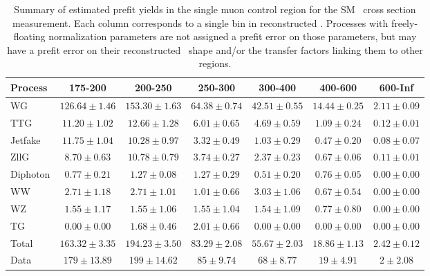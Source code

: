 \begin{table}[htbp]
  \begin{center}
    \caption{Summary of estimated prefit yields in the single muon control region for the SM \zinvg\ cross section measurement.
    Each column corresponds to a single bin in reconstructed \ETgamma. Processes with freely-floating normalization parameters
    are not assigned a prefit error on those parameters, but may have a prefit error on their reconstructed \ETgamma\ shape
    and/or the transfer factors linking them to other regions.}
    \label{tab:BkgSummaryMonomu_prefit}
    \begin{tabular}{|l|c|c|c|c|c|c|}
      \hline
      Process & 175-200 & 200-250 & 250-300 & 300-400 & 400-600 & 600-Inf \\
      \hline
      WG & $126.64{\pm}1.46$ & $153.30{\pm}1.63$ & $64.38{\pm}0.74$ & $42.51{\pm}0.55$ & $14.44{\pm}0.25$ & $2.11{\pm}0.09$ \\
      TTG & $11.20{\pm}1.02$ & $12.66{\pm}1.28$ & $6.01{\pm}0.65$ & $4.69{\pm}0.59$ & $1.09{\pm}0.24$ & $0.12{\pm}0.01$ \\
      Jetfake & $11.75{\pm}1.04$ & $10.28{\pm}0.97$ & $3.32{\pm}0.49$ & $1.03{\pm}0.29$ & $0.47{\pm}0.20$ & $0.08{\pm}0.07$ \\
      ZllG & $8.70{\pm}0.63$ & $10.78{\pm}0.79$ & $3.74{\pm}0.27$ & $2.37{\pm}0.23$ & $0.67{\pm}0.06$ & $0.11{\pm}0.01$ \\
      Diphoton & $0.77{\pm}0.21$ & $1.27{\pm}0.08$ & $1.27{\pm}0.29$ & $0.51{\pm}0.20$ & $0.76{\pm}0.05$ & $0.00{\pm}0.00$ \\
      WW & $2.71{\pm}1.18$ & $2.71{\pm}1.01$ & $1.01{\pm}0.66$ & $3.03{\pm}1.06$ & $0.67{\pm}0.54$ & $0.00{\pm}0.00$ \\
      WZ & $1.55{\pm}1.17$ & $1.55{\pm}1.06$ & $1.55{\pm}1.04$ & $1.54{\pm}1.09$ & $0.77{\pm}0.80$ & $0.00{\pm}0.00$ \\
      TG & $0.00{\pm}0.00$ & $1.68{\pm}0.46$ & $2.01{\pm}0.66$ & $0.00{\pm}0.00$ & $0.00{\pm}0.00$ & $0.00{\pm}0.00$ \\
      \hline
      Total & $163.32{\pm}3.35$ & $194.23{\pm}3.50$ & $83.29{\pm}2.08$ & $55.67{\pm}2.03$ & $18.86{\pm}1.13$ & $2.42{\pm}0.12$ \\
      \hline
      Data & $179{\pm}13.89$ & $199{\pm}14.62$ & $85{\pm}9.74$ & $68{\pm}8.77$ & $19{\pm}4.91$ & $2{\pm}2.08$ \\
      \hline
    \end{tabular}
  \end{center}
\end{table}

